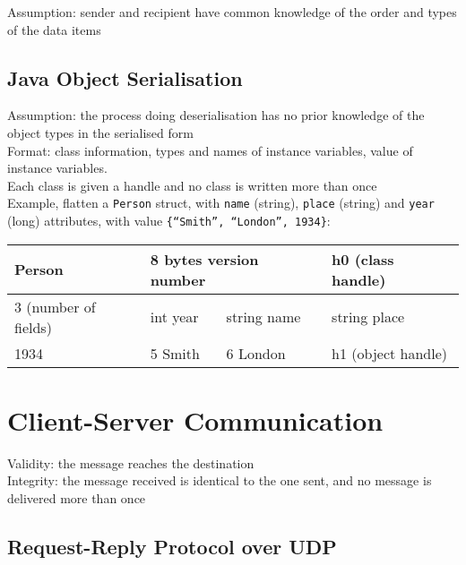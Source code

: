 \begin{multicols*}{2}
\noindent Assumption: sender and recipient have common knowledge of the order and types of the data items

\subsection{Java Object Serialisation}

\noindent Assumption: the process doing deserialisation has no prior knowledge of the object types in the serialised form\\

\noindent Format: class information, types and names of instance variables, value of instance variables. \\

\noindent Each class is given a handle and no class is written more than once\\

\noindent Example, flatten a \verb|Person| struct, with \verb|name| (string), \verb|place| (string) and \verb|year| (long) attributes, with value \verb|{“Smith”, “London”, 1934}|:\\

\begin{center}
\begin{tabular}{ |p{1.8cm}|p{1.8cm}|p{1.8cm}|p{1.8cm}| } 
    \hline
    Person & \multicolumn{2}{p{3.6cm}|}{8 bytes version number} & h0 (class handle) \\
    \hline
    3 (number of fields) & int year & string name & string place \\
    \hline
    1934 & 5 Smith & 6 London & h1 (object handle) \\
    \hline
\end{tabular}
\end{center}

\section{Client-Server Communication}

\noindent Validity: the message reaches the destination\\

\noindent Integrity: the message received is identical to the one sent, and no message is delivered more than once

\subsection{Request-Reply Protocol over UDP}


\end{multicols*}
